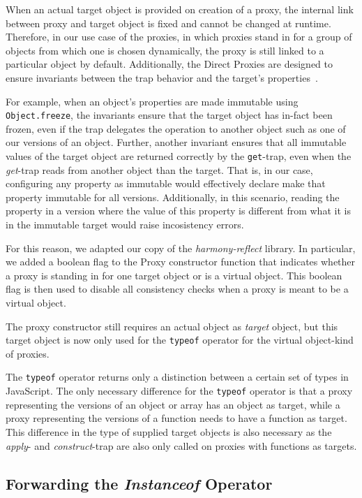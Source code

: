 When an actual target object is provided on creation of a proxy, the internal link between proxy and target object is fixed and cannot be changed at runtime.
Therefore, in our use case of the proxies, in which proxies stand in for a group of objects from which one is chosen dynamically, the proxy is still linked to a particular object by default.
Additionally, the Direct Proxies are designed to ensure invariants between the trap behavior and the target's properties~\cite{Cutsem2013TRP}.

For example, when an object's properties are made immutable using \lstinline{Object.freeze}, the invariants ensure that the target object has in-fact been frozen, even if the trap delegates the operation to another object such as one of our versions of an object.
Further, another invariant ensures that all immutable values of the target object are returned correctly by the \lstinline{get}-trap, even when the \emph{get}-trap reads from another object than the target. 
That is, in our case, configuring any property as immutable would effectively declare make that property immutable for all versions.
Additionally, in this scenario, reading the property in a version where the value of this property is different from what it is in the immutable target would raise incosistency errors.

For this reason, we adapted our copy of the \emph{harmony-reflect} library.
In particular, we added a boolean flag to the Proxy constructor function that indicates whether a proxy is standing in for one target object or is a virtual object.
This boolean flag is then used to disable all consistency checks when a proxy is meant to be a virtual object.

The proxy constructor still requires an actual object as \emph{target} object, but this target object is now only used for the \lstinline{typeof} operator for the virtual object-kind of proxies.

The \lstinline{typeof} operator returns only a distinction between a certain set of types in JavaScript.
The only necessary difference for the \lstinline{typeof} operator is that a proxy representing the versions of an object or array has an object as target, while a proxy representing the versions of a function needs to have a function as target.
This difference in the type of supplied target objects is also necessary as the \emph{apply}- and \emph{construct}-trap are also only called on proxies with functions as targets.


\subsection{Forwarding the \emph{Instanceof} Operator}


